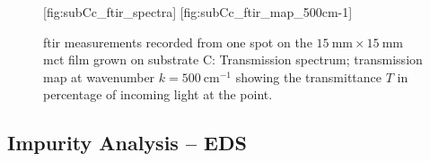 
\begin{figure}[htbp]
    \centering
    [fig:subCc_ftir_spectra]
    \hfill
    [fig:subCc_ftir_map_500cm-1]
    \caption[\Ac{ftir} measurement from one spot on the \ac{mct} film grown on substrate C.]{\Ac{ftir} measurements recorded from one spot on the $\SI{15}{\milli\metre}\times\SI{15}{\milli\metre}$ \ac{mct} film grown on substrate C:  Transmission spectrum;  transmission map at wavenumber $k=\SI{500}{\centi\metre^{-1}}$ showing the transmittance $T$ in percentage of incoming light at the point.}\label{fig:subCc_ftir}
\end{figure}

\subsection{Impurity Analysis -- EDS}

\begin{comment}
\begin{table}[htbp]
    \centering
    \caption[\Ac{eds} impurity analysis of \ac{mct} film grown by \ac{mbe} on substrate C.]{Results of the \ac{eds} impurity analysis at three different locations on the $\SI{15}{\milli\metre}\times\SI{15}{\milli\metre}$  \ac{mct} film grown by \ac{mbe} on (211)B-oriented substrate C (atomic concentration \%). The X-ray signal is acquired from $\SI{1270}{\micro\metre}\times\SI{890}{\micro\metre}$ areas near the centre, upper edge, and upper left corner.}\label{tab:subBc_eds_analysis}
   \begin{tabu} to 1.0\textwidth { X[1.85, r] X[1.125,c] X[1.125,c] X[1.125,c] X[1.125,c] X[1.125,c] X[1.125,c] }
        \hline
            & \textbf{\ce{Te}} (at.\%) & \textbf{\ce{Hg}} (at.\%) & \textbf{\ce{Cd}} (at.\%) & \textbf{\ce{C} } (at.\%) & \textbf{\,\ce{O}\,} (at.\%) & \textbf{\ce{Al}} (at.\%) \\
        \hline
        Near centre & \SI{44,36}{} & \SI{31,14}{} & \SI{12,19}{} & \SI{11,30}{} & \SI{0,86}{} & \SI{0,16}{} \\
        Near edge & \SI{44,12}{} & \SI{32,26}{} & \SI{10,81}{} & \SI{11,49}{} & \SI{1,14}{} & \SI{0,18}{} \\
        Near corner & \SI{44,26}{} & \SI{32,58}{} & \SI{10,71}{} & \SI{11,23}{} & \SI{1,03}{} & \SI{0,19}{}  \\
        \hline
    \end{tabu}
\end{table}
\end{comment}

